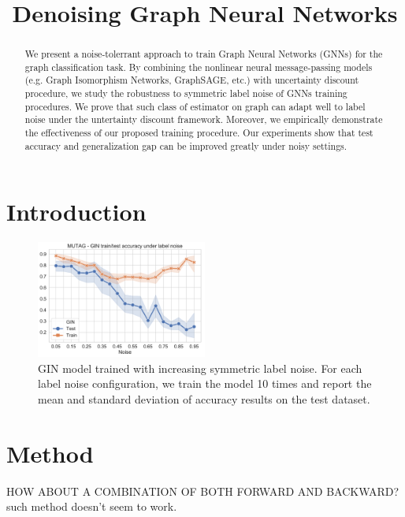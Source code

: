 \documentclass[letterpaper]{article}
\title{Denoising Graph Neural Networks}
\author{} %
\begin{document}
\maketitle

\begin{abstract}

We present a noise-tolerrant approach to train Graph Neural Networks (GNNs) for
the graph classification task. By combining the nonlinear neural message-passing 
models (e.g. Graph Isomorphism Networks, GraphSAGE, etc.) with uncertainty 
discount procedure, we study the robustness to symmetric label noise of GNNs 
training procedures. We prove that such class of estimator on graph can adapt 
well to label noise under the untertainty discount framework. Moreover, we 
empirically demonstrate the effectiveness of our proposed training procedure. 
Our experiments show that test accuracy and generalization gap can be improved 
greatly under noisy settings. 

\end{abstract}

\section{Introduction}

\begin{figure}
  \includegraphics[width=0.5\textwidth]{figs/MUTAG_noisy_training}
  \caption{GIN model trained with increasing symmetric label noise. 
  For each label noise configuration, we train the model 10 times and 
  report the mean and standard deviation of accuracy results on the test dataset.}
  \label{fig:mutag_gin}
\end{figure}

\section{Method}

HOW ABOUT A COMBINATION OF BOTH FORWARD AND BACKWARD? 
such method doesn't seem to work.
\end{document}
